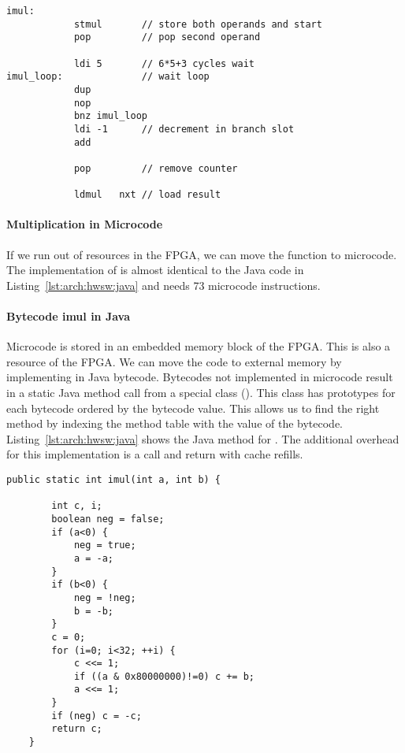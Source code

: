 \begin{lstlisting}[float, caption={Microcode to access the Booth multiplier},
label=lst:arch:hwsw:micro]
    imul:
            stmul       // store both operands and start
            pop         // pop second operand

            ldi 5       // 6*5+3 cycles wait
imul_loop:              // wait loop
            dup
            nop
            bnz imul_loop
            ldi -1      // decrement in branch slot
            add

            pop         // remove counter

            ldmul   nxt // load result
\end{lstlisting}

\paragraph{Multiplication in Microcode}

If we run out of resources in the FPGA, we can move the function to
microcode. The implementation of  is almost identical to
the Java code in Listing~\ref{lst:arch:hwsw:java} and needs 73
microcode instructions.

\paragraph{Bytecode imul in Java}

Microcode is stored in an embedded memory block of the FPGA. This is
also a resource of the FPGA. We can move the code to external memory
by implementing  in Java bytecode. Bytecodes not
implemented in microcode result in a static Java method call from a
special class (). This class has
prototypes for each bytecode ordered by the bytecode value. This
allows us to find the right method by indexing the method table with
the value of the bytecode. Listing~\ref{lst:arch:hwsw:java} shows
the Java method for . The additional overhead for this
implementation is a call and return with cache refills.


\begin{lstlisting}[float, caption={Implementation of bytecode \code{imul} in Java},
label=lst:arch:hwsw:java]
    public static int imul(int a, int b) {

        int c, i;
        boolean neg = false;
        if (a<0) {
            neg = true;
            a = -a;
        }
        if (b<0) {
            neg = !neg;
            b = -b;
        }
        c = 0;
        for (i=0; i<32; ++i) {
            c <<= 1;
            if ((a & 0x80000000)!=0) c += b;
            a <<= 1;
        }
        if (neg) c = -c;
        return c;
    }
\end{lstlisting}

